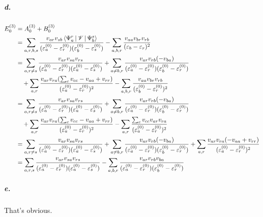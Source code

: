 \documentclass[a4paper]{article}
\newcommand{\subex}[1]{\subparagraph{#1}}
\numberwithin{equation}{subsection}
\begin{document}
\subex{d.}
\begin{align}
E_0^{(3)} &= A_0^{(3)} + B_0^{(3)} \notag\\
&= \sum_{a,r,b,s} 
\dfrac{v_{ar}v_{sb} \Braket{\Psi_a^r|\mathscr{V}|\Psi_b^s} }{(\varepsilon_a^{(0)} - \varepsilon_r^{(0)}) (\varepsilon_b^{(0)} - \varepsilon_s^{(0)})} 
- \sum_{a,b,r}\dfrac{v_{aa} v_{br}v_{rb}}{(\varepsilon_b - \varepsilon_r)^2}
\notag\\
&=  \sum_{a,r\neq s} 
\dfrac{v_{ar}v_{sa} v_{rs} }{(\varepsilon_a^{(0)} - \varepsilon_r^{(0)}) (\varepsilon_a^{(0)} - \varepsilon_s^{(0)})} 
+ \sum_{a\neq b,r} 
\dfrac{v_{ar}v_{rb}(-v_{ba}) }{(\varepsilon_a^{(0)} - \varepsilon_r^{(0)}) (\varepsilon_b^{(0)} - \varepsilon_r^{(0)})} 
\notag\\
&\quad {} + \sum_{a,r} 
\dfrac{v_{ar}v_{ra} (\sum_c v_{cc} - v_{aa} + v_{rr}) }{(\varepsilon_a^{(0)} - \varepsilon_r^{(0)})^2} 
- \sum_{a,b,r}\dfrac{v_{aa} v_{br}v_{rb}}{(\varepsilon_b^{(0)} - \varepsilon_r^{(0)})^2}
\notag\\
&=  \sum_{a,r\neq s} 
\dfrac{v_{ar}v_{sa} v_{rs} }{(\varepsilon_a^{(0)} - \varepsilon_r^{(0)}) (\varepsilon_a^{(0)} - \varepsilon_s^{(0)})} 
+ \sum_{a\neq b,r} 
\dfrac{v_{ar}v_{rb}(-v_{ba}) }{(\varepsilon_a^{(0)} - \varepsilon_r^{(0)}) (\varepsilon_b^{(0)} - \varepsilon_r^{(0)})} 
\notag\\
&\quad {} + \sum_{a,r} 
\dfrac{v_{ar}v_{ra} (\sum_c v_{cc} - v_{aa} + v_{rr}) }{(\varepsilon_a^{(0)} - \varepsilon_r^{(0)})^2} 
- \sum_{a,r}\dfrac{\sum_c v_{cc} v_{ar}v_{ra}}{(\varepsilon_a^{(0)} - \varepsilon_r^{(0)})^2}
\notag\\
&=  \sum_{a,r\neq s} 
\dfrac{v_{ar}v_{sa} v_{rs} }{(\varepsilon_a^{(0)} - \varepsilon_r^{(0)}) (\varepsilon_a^{(0)} - \varepsilon_s^{(0)})} 
+ \sum_{a\neq b,r} 
\dfrac{v_{ar}v_{rb}(-v_{ba}) }{(\varepsilon_a^{(0)} - \varepsilon_r^{(0)}) (\varepsilon_b^{(0)} - \varepsilon_r^{(0)})} 
+ \sum_{a,r} 
\dfrac{v_{ar}v_{ra} ( - v_{aa} + v_{rr}) }{(\varepsilon_a^{(0)} - \varepsilon_r^{(0)})^2} 
\notag\\
&=  \sum_{a,r,s} 
\dfrac{v_{ar}v_{sa} v_{rs} }{(\varepsilon_a^{(0)} - \varepsilon_r^{(0)}) (\varepsilon_a^{(0)} - \varepsilon_s^{(0)})} 
- \sum_{a,b,r} 
\dfrac{v_{ar}v_{rb}v_{ba} }{(\varepsilon_a^{(0)} - \varepsilon_r^{(0)}) (\varepsilon_b^{(0)} - \varepsilon_r^{(0)})} 
\end{align}

\subex{e.}
That's obvious.
\end{document}
